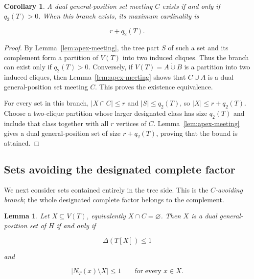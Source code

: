\documentclass[preprint,12pt]{elsarticle}
\newtheorem{lemma}[theorem]{Lemma}
\newtheorem{corollary}[theorem]{Corollary}
\numberwithin{equation}{section}
\begin{document}
\begin{corollary}\label{cor:apex-meeting-maximum}
A dual general-position set meeting \(C\) exists
if and only if \(q_2(T)>0\). When this branch exists, its maximum
cardinality is

\[
r+q_2(T).
\]
\end{corollary}

\begin{proof}
By Lemma~\ref{lem:apex-meeting}, the tree part \(S\) of such a set and its
complement form a partition of \(V(T)\) into two induced cliques. Thus
the branch can exist only if \(q_2(T)>0\). Conversely, if
\(V(T)=A\mathbin{\dot\cup}B\) is a partition into two induced cliques,
then Lemma~\ref{lem:apex-meeting} shows that \(C\cup A\) is a dual general-position set
meeting \(C\). This proves the existence equivalence.

For every set in this branch, \(|X\cap C|\le r\) and \(|S|\le q_2(T)\),
so \(|X|\le r+q_2(T)\). Choose a two-clique partition whose larger
designated class has size \(q_2(T)\) and include that class together
with all \(r\) vertices of \(C\). Lemma~\ref{lem:apex-meeting} gives a dual
general-position set of size \(r+q_2(T)\), proving that the bound is
attained.
\end{proof}

\subsection{Sets avoiding the designated complete factor}\label{sec:apex-avoiding}

We next consider sets contained entirely in the tree side. This is the
\emph{\(C\)-avoiding branch}; the whole designated complete factor belongs
to the complement.

\begin{lemma}\label{lem:apex-avoiding}
Let \(X\subseteq V(T)\), equivalently
\(X\cap C=\varnothing\). Then \(X\) is a dual general-position set of
\(H\) if and only if

\[
\Delta(T[X])\le 1
\]

and

\[
|N_T(x)\setminus X|\le 1\qquad\text{for every }x\in X.
\]
\end{lemma}
\end{document}
